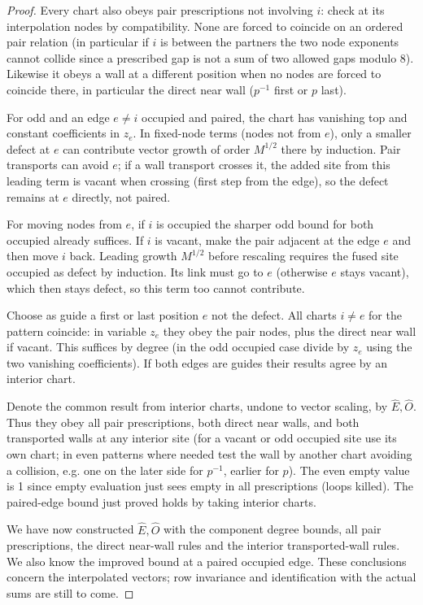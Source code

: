 \begin{proof}
Every chart also obeys pair prescriptions not involving \(i\): check at its interpolation nodes by compatibility. None are forced to coincide on an ordered pair relation (in particular if \(i\) is between the partners the two node exponents cannot collide since a prescribed gap is not a sum of two allowed gaps modulo 8). Likewise it obeys a wall at a different position when no nodes are forced to coincide there, in particular the direct near wall (\(p^{-1}\) first or \(p\) last).

For odd and an edge \(e\ne i\) occupied and paired, the chart has vanishing top and constant coefficients in \(z_e\). In fixed-node terms (nodes not from \(e\)), only a smaller defect at \(e\) can contribute vector growth of order \(M^{1/2}\) there by induction. Pair transports can avoid \(e\); if a wall transport crosses it, the added site from this leading term is vacant when crossing (first step from the edge), so the defect remains at \(e\) directly, not paired. 

For moving nodes from \(e\), if \(i\) is occupied the sharper odd bound for both occupied already suffices. If \(i\) is vacant, make the pair adjacent at the edge \(e\) and then move \(i\) back. Leading growth \(M^{1/2}\) before rescaling requires the fused site occupied as defect by induction. Its link must go to \(e\) (otherwise \(e\) stays vacant), which then stays defect, so this term too cannot contribute.

Choose as guide a first or last position \(e\) not the defect. All charts \(i\ne e\) for the pattern coincide: in variable \(z_e\) they obey the pair nodes, plus the direct near wall if vacant. This suffices by degree (in the odd occupied case divide by \(z_e\) using the two vanishing coefficients). If both edges are guides their results agree by an interior chart. 

Denote the common result from interior charts, undone to vector scaling, by \(\widehat E,\widehat O\). Thus they obey all pair prescriptions, both direct near walls, and both transported walls at any interior site (for a vacant or odd occupied site use its own chart; in even patterns where needed test the wall by another chart avoiding a collision, e.g. one on the later side for \(p^{-1}\), earlier for \(p\)). The even empty value is 1 since empty evaluation just sees empty in all prescriptions (loops killed). The paired-edge bound just proved holds by taking interior charts.

We have now constructed $\widehat E,\widehat O$ with the component degree
bounds, all pair prescriptions, the direct near-wall rules and the
interior transported-wall rules. We also know the improved bound at a
paired occupied edge. These conclusions concern the interpolated vectors;
row invariance and identification with the actual sums are still to come.


\end{proof}
